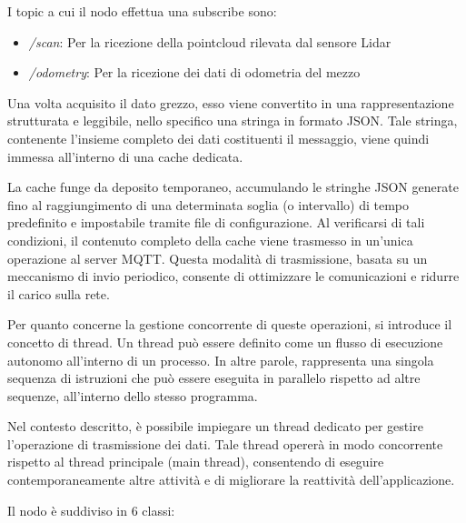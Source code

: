 \noindent I topic a cui il nodo effettua una subscribe sono:

\begin{itemize}
  \item \textit{/scan}: Per la ricezione della pointcloud rilevata dal sensore Lidar
  \item \textit{/odometry}: Per la ricezione dei dati di odometria del mezzo
\end{itemize}

\noindent Una volta acquisito il dato grezzo, esso viene convertito in una rappresentazione strutturata e leggibile, nello specifico una stringa in formato JSON. Tale stringa, contenente l'insieme completo dei dati costituenti il messaggio, viene quindi immessa all'interno di una cache dedicata.

\noindent La cache funge da deposito temporaneo, accumulando le stringhe JSON generate fino al raggiungimento di una determinata soglia (o intervallo) di tempo predefinito e impostabile tramite file di configurazione. Al verificarsi di tali condizioni, il contenuto completo della cache viene trasmesso in un'unica operazione al server MQTT. Questa modalità di trasmissione, basata su un meccanismo di invio periodico, consente di ottimizzare le comunicazioni e ridurre il carico sulla rete.

\noindent Per quanto concerne la gestione concorrente di queste operazioni, si introduce il concetto di thread. Un thread può essere definito come un flusso di esecuzione autonomo all'interno di un processo. In altre parole, rappresenta una singola sequenza di istruzioni che può essere eseguita in parallelo rispetto ad altre sequenze, all'interno dello stesso programma.

\noindent Nel contesto descritto, è possibile impiegare un thread dedicato per gestire l'operazione di trasmissione dei dati. Tale thread opererà in modo concorrente rispetto al thread principale (main thread), consentendo di eseguire contemporaneamente altre attività e di migliorare la reattività dell'applicazione.

\noindent Il nodo è suddiviso in 6 classi:

